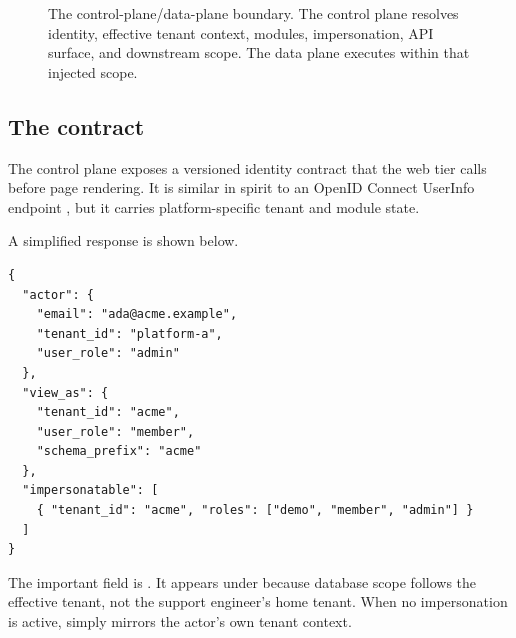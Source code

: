\begin{figure}[H]
{%
  }
  \caption{The control-plane/data-plane boundary. The control plane resolves identity, effective tenant context, modules, impersonation, API surface, and downstream scope. The data plane executes within that injected scope.}
  \label{fig:arch_overview}
\end{figure}

\subsection{The  contract}

The control plane exposes a versioned identity contract that the web tier calls before page rendering. It is similar in spirit to an OpenID Connect UserInfo endpoint \cite{oidc_core}, but it carries platform-specific tenant and module state.

A simplified response is shown below.

\begin{lstlisting}[style=json, caption={Simplified identity and effective-context contract.}]
{
  "actor": {
    "email": "ada@acme.example",
    "tenant_id": "platform-a",
    "user_role": "admin"
  },
  "view_as": {
    "tenant_id": "acme",
    "user_role": "member",
    "schema_prefix": "acme"
  },
  "impersonatable": [
    { "tenant_id": "acme", "roles": ["demo", "member", "admin"] }
  ]
}
\end{lstlisting}

The important field is \scopeprefix{}. It appears under \viewas{} because database scope follows the effective tenant, not the support engineer's home tenant. When no impersonation is active, \viewas{} simply mirrors the actor's own tenant context.

